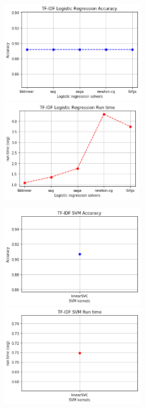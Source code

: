 \documentclass[oneside,onecolumn]{article}
\begin{document}
\begin{figure}[H]
	\centering
	
	\includegraphics[height=5cm]{report_plot/plot_tfidf/logistic_regression_accuracy.png}
	\includegraphics[height=5cm]{report_plot/plot_tfidf/logistic_regression_runtime.png}
	
	\includegraphics[height=5cm]{report_plot/plot_tfidf/svm_accuracy.png}
	\includegraphics[height=5cm]{report_plot/plot_tfidf/svm_runtime.png}
	

\end{figure}
\end{document}
